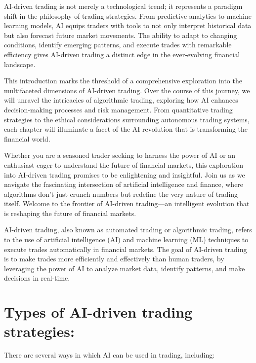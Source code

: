 \documentclass[
  letterpaper,
  DIV=11,
  numbers=noendperiod]{scrreprt}
\begin{document}
AI-driven trading is not merely a technological trend; it represents a
paradigm shift in the philosophy of trading strategies. From predictive
analytics to machine learning models, AI equips traders with tools to
not only interpret historical data but also forecast future market
movements. The ability to adapt to changing conditions, identify
emerging patterns, and execute trades with remarkable efficiency gives
AI-driven trading a distinct edge in the ever-evolving financial
landscape.

This introduction marks the threshold of a comprehensive exploration
into the multifaceted dimensions of AI-driven trading. Over the course
of this journey, we will unravel the intricacies of algorithmic trading,
exploring how AI enhances decision-making processes and risk management.
From quantitative trading strategies to the ethical considerations
surrounding autonomous trading systems, each chapter will illuminate a
facet of the AI revolution that is transforming the financial world.

Whether you are a seasoned trader seeking to harness the power of AI or
an enthusiast eager to understand the future of financial markets, this
exploration into AI-driven trading promises to be enlightening and
insightful. Join us as we navigate the fascinating intersection of
artificial intelligence and finance, where algorithms don't just crunch
numbers but redefine the very nature of trading itself. Welcome to the
frontier of AI-driven trading---an intelligent evolution that is
reshaping the future of financial markets.

AI-driven trading, also known as automated trading or algorithmic
trading, refers to the use of artificial intelligence (AI) and machine
learning (ML) techniques to execute trades automatically in financial
markets. The goal of AI-driven trading is to make trades more
efficiently and effectively than human traders, by leveraging the power
of AI to analyze market data, identify patterns, and make decisions in
real-time.

\section*{Types of AI-driven trading
strategies:}\label{types-of-ai-driven-trading-strategies}


There are several ways in which AI can be used in trading, including:
\end{document}

